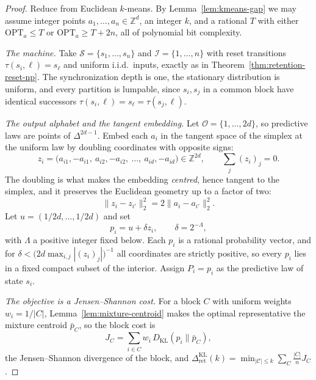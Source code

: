 \documentclass[12pt]{article}
\theoremstyle{definition}
\newcommand{\RetKL}{\Delta_{\mathrm{ret}}^{\mathrm{KL}}}
\begin{document}
\begin{proof}
Reduce from Euclidean $k$-means.  By Lemma~\ref{lem:kmeans-gap} we may assume
integer points $a_1,\dots,a_n\in\mathbb Z^{d}$, an integer $k$, and a rational
$T$ with either $\mathrm{OPT}_a\le T$ or $\mathrm{OPT}_a\ge T+2n$, all of
polynomial bit complexity.

\emph{The machine.}  Take $\mathcal S=\{s_1,\dots,s_n\}$ and
$\mathcal I=\{1,\dots,n\}$ with reset transitions $\tau(s_i,\ell)=s_\ell$ and
uniform i.i.d.\ inputs, exactly as in Theorem~\ref{thm:retention-reset-np}.
The synchronization depth is one, the stationary distribution is uniform, and
every partition is lumpable, since $s_i,s_j$ in a common block have identical
successors $\tau(s_i,\ell)=s_\ell=\tau(s_j,\ell)$.

\emph{The output alphabet and the tangent embedding.}  Let
$\mathcal O=\{1,\dots,2d\}$, so predictive laws are points of
$\Delta^{2d-1}$.  Embed each $a_i$ in the tangent space of the simplex at the
uniform law by doubling coordinates with opposite signs:
\[
z_i=\bigl(a_{i1},-a_{i1},\ a_{i2},-a_{i2},\ \dots,\ a_{id},-a_{id}\bigr)
\in\mathbb Z^{2d},
\qquad
\sum_{j}(z_i)_j=0 .
\]
The doubling is what makes the embedding \emph{centred}, hence tangent to the
simplex, and it preserves the Euclidean geometry up to a factor of two:
\[
\|z_i-z_{i'}\|_2^2=2\|a_i-a_{i'}\|_2^2 .
\]
Let $u=(1/2d,\dots,1/2d)$ and set
\[
p_i=u+\delta z_i,
\qquad
\delta=2^{-\Lambda},
\]
with $\Lambda$ a positive integer fixed below.  Each $p_i$ is a rational
probability vector, and for $\delta<\bigl(2d\max_{i,j}|(z_i)_j|\bigr)^{-1}$ all
coordinates are strictly positive, so every $p_i$ lies in a fixed compact
subset of the interior.  Assign $P_i=p_i$ as the predictive law of state $s_i$.

\emph{The objective is a Jensen--Shannon cost.}  For a block $C$ with uniform
weights $w_i=1/|C|$, Lemma~\ref{lem:mixture-centroid} makes the optimal
representative the mixture centroid $\bar p_C$, so the block cost is
\[
J_C=\sum_{i\in C}w_i\,D_{\mathrm{KL}}(p_i\|\bar p_C),
\]
the Jensen--Shannon divergence of the block, and
$\RetKL(k)=\min_{|\mathcal C|\le k}\sum_C\frac{|C|}{n}J_C$.


\end{proof}
\end{document}
